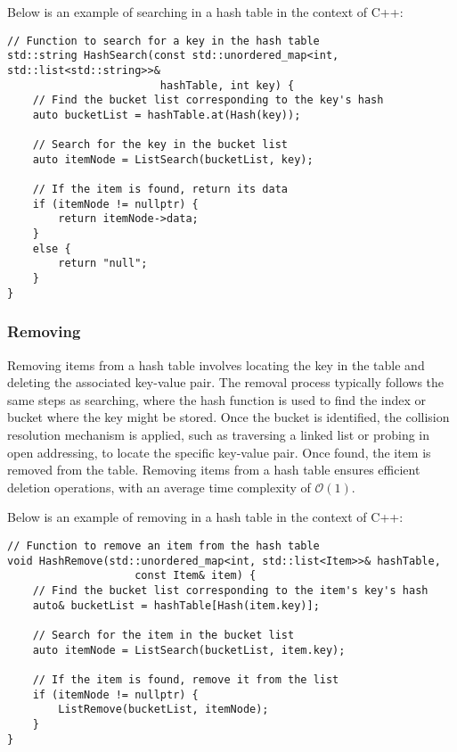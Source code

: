 \begin{solution}

Below is an example of searching in a hash table in the context of C++:

\horizontalline

\begin{verbatim}
// Function to search for a key in the hash table
std::string HashSearch(const std::unordered_map<int, std::list<std::string>>& 
                        hashTable, int key) {
    // Find the bucket list corresponding to the key's hash
    auto bucketList = hashTable.at(Hash(key));
    
    // Search for the key in the bucket list
    auto itemNode = ListSearch(bucketList, key);

    // If the item is found, return its data
    if (itemNode != nullptr) {
        return itemNode->data;
    }
    else {
        return "null";
    }
}
\end{verbatim}

\horizontalline

\end{solution}

\subsubsection{Removing}

Removing items from a hash table involves locating the key in the table and deleting the associated key-value pair. The removal process typically follows the same steps as searching, where the hash function is used 
to find the index or bucket where the key might be stored. Once the bucket is identified, the collision resolution mechanism is applied, such as traversing a linked list or probing in open addressing, to locate the 
specific key-value pair. Once found, the item is removed from the table. Removing items from a hash table ensures efficient deletion operations, with an average time complexity of $\mathcal{O}(1)$.

\begin{solution}

Below is an example of removing in a hash table in the context of C++:

\horizontalline

\begin{verbatim}
// Function to remove an item from the hash table
void HashRemove(std::unordered_map<int, std::list<Item>>& hashTable, 
                    const Item& item) {
    // Find the bucket list corresponding to the item's key's hash
    auto& bucketList = hashTable[Hash(item.key)];

    // Search for the item in the bucket list
    auto itemNode = ListSearch(bucketList, item.key);

    // If the item is found, remove it from the list
    if (itemNode != nullptr) {
        ListRemove(bucketList, itemNode);
    }
}
\end{verbatim}

\horizontalline

\end{solution}

